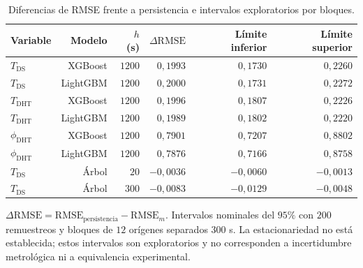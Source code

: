 \begin{table}[htbp]
\centering
\caption{Diferencias de RMSE frente a persistencia e intervalos exploratorios por bloques.}
\label{tab:res_intervalos}
\small
\setlength{\tabcolsep}{5pt}
\begin{tabular}{lrrrrr}
\toprule
Variable & Modelo & $h$ (s) & $\Delta\mathrm{RMSE}$ & Límite inferior & Límite superior \\
\midrule
$T_{\mathrm{DS}}$ & XGBoost & $1200$ & $0{,}1993$ & $0{,}1730$ & $0{,}2260$ \\
$T_{\mathrm{DS}}$ & LightGBM & $1200$ & $0{,}2000$ & $0{,}1731$ & $0{,}2272$ \\
$T_{\mathrm{DHT}}$ & XGBoost & $1200$ & $0{,}1996$ & $0{,}1807$ & $0{,}2226$ \\
$T_{\mathrm{DHT}}$ & LightGBM & $1200$ & $0{,}1989$ & $0{,}1802$ & $0{,}2220$ \\
$\phi_{\mathrm{DHT}}$ & XGBoost & $1200$ & $0{,}7901$ & $0{,}7207$ & $0{,}8802$ \\
$\phi_{\mathrm{DHT}}$ & LightGBM & $1200$ & $0{,}7876$ & $0{,}7166$ & $0{,}8758$ \\
$T_{\mathrm{DS}}$ & Árbol & $20$ & $-0{,}0036$ & $-0{,}0060$ & $-0{,}0013$ \\
$T_{\mathrm{DS}}$ & Árbol & $300$ & $-0{,}0083$ & $-0{,}0129$ & $-0{,}0048$ \\
\bottomrule
\end{tabular}
\par\vspace{3pt}
\begin{minipage}{0.98\textwidth}\footnotesize
$\Delta\mathrm{RMSE}=\mathrm{RMSE}_{\mathrm{persistencia}}-\mathrm{RMSE}_{m}$. Intervalos nominales del $95\%$ con $200$ remuestreos y bloques de $12$ orígenes separados $300$ s. La estacionariedad no está establecida; estos intervalos son exploratorios y no corresponden a incertidumbre metrológica ni a equivalencia experimental.
\end{minipage}
\end{table}
